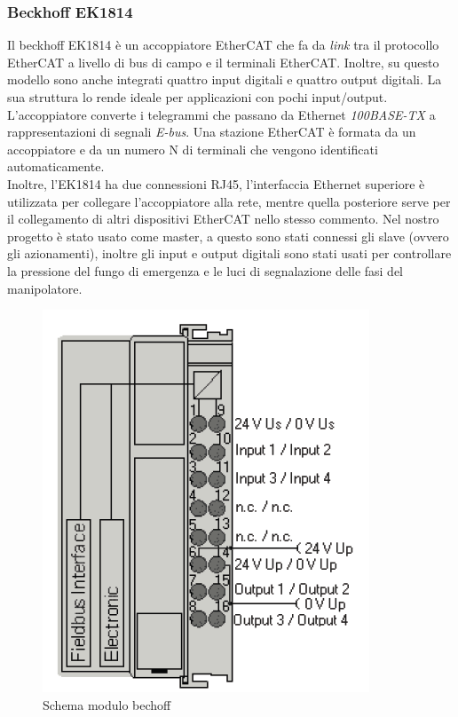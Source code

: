 \subsubsection{Beckhoff EK1814}
Il beckhoff EK1814 è un accoppiatore EtherCAT che fa da \textit{link} tra il protocollo EtherCAT a livello di bus di campo e il terminali EtherCAT. Inoltre, su questo modello sono anche integrati quattro input digitali e quattro output digitali. La sua struttura lo rende ideale per applicazioni con pochi input/output. L'accoppiatore converte i telegrammi che passano da Ethernet \textit{100BASE-TX} a rappresentazioni di segnali \textit{E-bus}. Una stazione EtherCAT è formata da un accoppiatore e da un numero N di terminali che vengono identificati automaticamente.
\\Inoltre, l'EK1814 ha due connessioni RJ45, l'interfaccia Ethernet superiore è utilizzata per collegare l'accoppiatore alla rete, mentre quella posteriore serve per il collegamento di altri dispositivi EtherCAT nello stesso commento. Nel nostro progetto è stato usato come master, a questo sono stati connessi gli slave (ovvero gli azionamenti), inoltre gli input e output digitali sono stati usati per controllare la pressione del fungo di emergenza e le luci di segnalazione delle fasi del manipolatore.
\begin{figure}[ht]
	\begin{center}
		\includegraphics[scale=0.6]{Immagini/Sperimentale/Beckoffschema.PNG}
		\caption{Schema modulo bechoff}
		\label{fig:ModuloBechoff}
	\end{center}
\end{figure}
